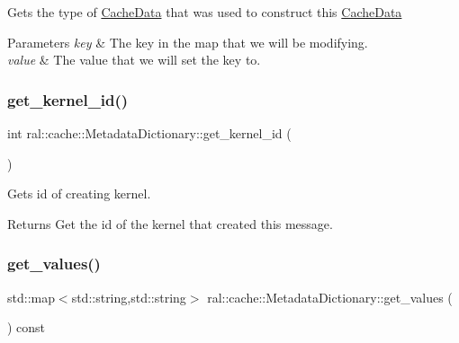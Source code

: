 Gets the type of \hyperlink{classral_1_1cache_1_1CacheData}{Cache\+Data} that was used to construct this \hyperlink{classral_1_1cache_1_1CacheData}{Cache\+Data} 
\begin{DoxyParams}{Parameters}
{\em key} & The key in the map that we will be modifying. \\
\hline
{\em value} & The value that we will set the key to. \\
\hline
\end{DoxyParams}
\mbox{\label{classral_1_1cache_1_1MetadataDictionary_a03066b3e050bf5f504613aab7604d768}} 
\subsubsection{\texorpdfstring{get\+\_\+kernel\+\_\+id()}{get\_kernel\_id()}}
{\footnotesize\ttfamily int ral\+::cache\+::\+Metadata\+Dictionary\+::get\+\_\+kernel\+\_\+id (\begin{DoxyParamCaption}{ }\end{DoxyParamCaption})\hspace{0.3cm}{\ttfamily [inline]}}

Gets id of creating kernel. \begin{DoxyReturn}{Returns}
Get the id of the kernel that created this message. 
\end{DoxyReturn}
\mbox{\label{classral_1_1cache_1_1MetadataDictionary_abdc2863d96dc839565f2078471f4c9f7}} 
\subsubsection{\texorpdfstring{get\+\_\+values()}{get\_values()}}
{\footnotesize\ttfamily std\+::map$<$std\+::string,std\+::string$>$ ral\+::cache\+::\+Metadata\+Dictionary\+::get\+\_\+values (\begin{DoxyParamCaption}{ }\end{DoxyParamCaption}) const\hspace{0.3cm}{\ttfamily [inline]}}

